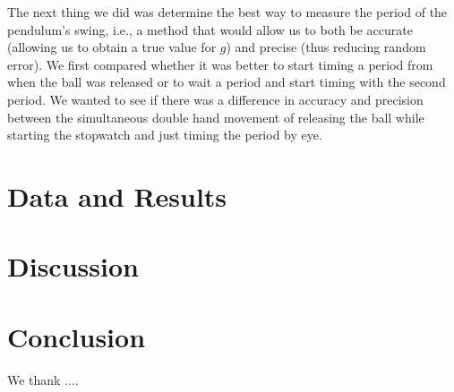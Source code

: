 \documentclass[iop]{emulateapj}
\def\g{$g$}
\begin{document}
The next thing we did was determine the best way to measure the period of the 
pendulum's swing, i.e., a method that would allow us to both be accurate 
(allowing us to obtain a true value for \g) and precise (thus reducing random 
error). We first compared whether it was better to start timing a period from 
when the ball was released or to wait a period and start timing with the 
second period.  We wanted to see if there was a difference in accuracy and 
precision between the simultaneous double hand movement of releasing the ball 
while starting the stopwatch and just timing the period by eye. 






\section{Data and Results}
\label{sec:data}













\section{Discussion}
\label{sec:discuss}
















\section{Conclusion}














\acknowledgments

We thank ....





\begin{thebibliography}{}


\end{thebibliography}{}
\end{document}
